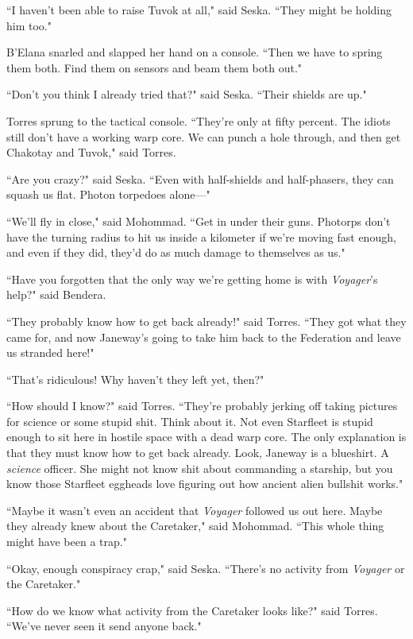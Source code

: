 \documentclass[twoside,letterpaper,12pt]{memoir}
\begin{document}
``I haven't been able to raise Tuvok at all," said Seska. ``They might be holding him too."

B'Elana snarled and slapped her hand on a console. ``Then we have to spring them both. Find them on sensors and beam them both out."

``Don't you think I already tried that?" said Seska. ``Their shields are up."

Torres sprung to the tactical console. ``They're only at fifty percent. The idiots still don't have a working warp core. We can punch a hole through, and then get Chakotay and Tuvok," said Torres.

``Are you crazy?" said Seska. ``Even with half-shields and half-phasers, they can squash us flat. Photon torpedoes alone---"

``We'll fly in close," said Mohommad. ``Get in under their guns. Photorps don't have the turning radius to hit us inside a kilometer if we're moving fast enough, and even if they did, they'd do as much damage to themselves as us."

``Have you forgotten that the only way we're getting home is with \textit{Voyager}'s help?" said Bendera.

``They probably know how to get back already!" said Torres. ``They got what they came for, and now Janeway's going to take him back to the Federation and leave us stranded here!"

``That's ridiculous! Why haven't they left yet, then?"

``How should I know?" said Torres. ``They're probably jerking off taking pictures for science or some stupid shit. Think about it. Not even Starfleet is stupid enough to sit here in hostile space with a dead warp core. The only explanation is that they must know how to get back already. Look, Janeway is a blueshirt. A \textit{science} officer. She might not know shit about commanding a starship, but you know those Starfleet eggheads love figuring out how ancient alien bullshit works."

``Maybe it wasn't even an accident that \textit{Voyager} followed us out here. Maybe they already knew about the Caretaker," said Mohommad. ``This whole thing might have been a trap."

``Okay, enough conspiracy crap," said Seska. ``There's no activity from \textit{Voyager} or the Caretaker."

``How do we know what activity from the Caretaker looks like?" said Torres. ``We've never seen it send anyone back."
\end{document}
